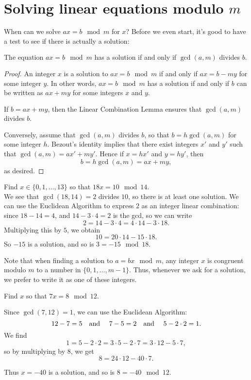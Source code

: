 \documentclass[11pt,dvipsnames]{book}
\numberwithin{figure}{section} %
\numberwithin{table}{section} %
\begin{document}
\section{Solving linear equations modulo $m$}%
\label{linearequationsmodm}

When can we solve $ax = b\mod m$ for $x$? Before we even start, it's good to have a test to see if there is actually a solution:

\begin{theorem}%
The equation $ax = b\mod m$ has a solution if and only if $\gcd(a,m)$ divides $b$.
\end{theorem}

\begin{proof} An integer $x$ is a solution to $ax = b\mod m$ if and only if $ax=b-my$ for some integer $y$.
In other words, $ax = b\mod m$ has a solution if and only if $b$ can be written as $ax + my$ for some integers $x$ and $y$.

If $b = ax+my$, then the Linear Combination Lemma ensures that $\gcd(a,m)$ divides $b$.

Conversely, assume that $\gcd(a,m)$ divides $b$, so that $b = h\gcd(a,m)$ for some integer $h$.
Bezout's identity implies that there exist integers $x'$ and $y'$ such that $\gcd(a,m)=ax'+my'$.
Hence if $x = hx'$ and $y=hy'$, then
\[
b = h\gcd(a,m) = ax + my,
\]
as desired.
\end{proof}

\begin{example}
Find $x\in \{0,1,...,13\}$ so that $18x = 10\mod 14$. \\

We see that $\gcd(18,14)=2$ divides $10$, so there is at least one solution.
We can use the Euclidean Algorithm to express $2$ as an integer linear combination:
since $18 - 14 = 4$, and $14 - 3\cdot 4 = 2$ is the gcd, so we can write
\[
2 = 14 - 3\cdot 4 = 4\cdot 14 - 3 \cdot 18.
\]
Multiplying this by $5$, we obtain
\[
10 = 20\cdot 14 - 15 \cdot 18.
\]
So $-15$ is a solution, and so is $3 = -15 \mod 18$.
\end{example}

Note that when finding a solution to $a = bx\mod m$, any integer $x$ is congruent modulo $m$ to a number in $\{0,1,...,m-1\}$. Thus, whenever we ask for a solution, we prefer to write it as one of these integers.

\begin{exercise}
Find $x$ so that $7x = 8\mod 12$. \\
\begin{solution}
Since $\gcd(7,12)=1$, we can use the Euclidean Algorithm:
\[
12-7 = 5 \text{\quad and \quad} 7-5 = 2 \text{\quad and \quad} 5-2\cdot 2 = 1.
\]
We find
\[
1 = 5 - 2\cdot 2 = 3\cdot 5 - 2\cdot 7 = 3\cdot 12 - 5\cdot 7,
\]
so by multiplying by $8$, we get
\[
8 = 24 \cdot 12 - 40 \cdot 7.
\]

Thus $x = -40$ is a solution, and so is $8 = -40 \mod 12$.
\end{solution}
\end{exercise}
\end{document}
